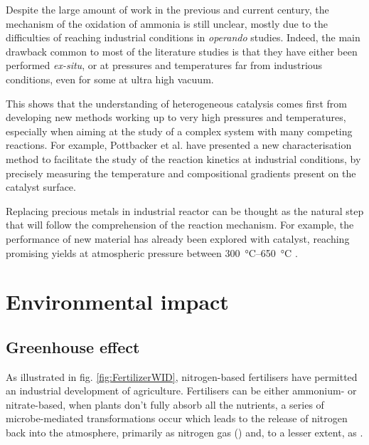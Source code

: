 Despite the large amount of work in the previous and current century, the mechanism of the oxidation of ammonia is still unclear, mostly due to the difficulties of reaching industrial conditions in \textit{operando} studies.
Indeed, the main drawback common to most of the literature studies is that they have either been performed \textit{ex-situ}, or at pressures and temperatures far from industrious conditions, even for some at ultra high vacuum.

This shows that the understanding of heterogeneous catalysis comes first from developing new methods working up to very high pressures and temperatures, especially when aiming at the study of a complex system with many competing reactions.
For example, Pottbacker et al. \parencite*{Pottbacker2022} have presented a new characterisation method to facilitate the study of the reaction kinetics at industrial conditions, by precisely measuring the temperature and compositional gradients present on the catalyst surface.

Replacing precious metals in industrial reactor can be thought as the natural step that will follow the comprehension of the reaction mechanism.
For example, the performance of new material has already been explored with  catalyst, reaching promising  yields at atmospheric pressure between \qtyrange{300}{650}{\degreeCelsius} \parencite{Ruan2022}.


\section{Environmental impact}

\subsection{Greenhouse effect}

As illustrated in fig. \ref{fig:FertilizerWID}, nitrogen-based fertilisers have permitted an industrial development of agriculture.
Fertilisers can be either ammonium- or nitrate-based, when plants don't fully absorb all the nutrients, a series of microbe-mediated transformations occur which leads to the release of nitrogen back into the atmosphere, primarily as nitrogen gas () and, to a lesser extent, as .

